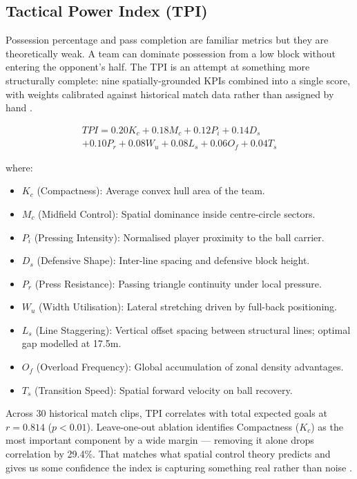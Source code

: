 \documentclass[conference]{IEEEtran}
\begin{document}
\subsection{Tactical Power Index (TPI)}

Possession percentage and pass completion are familiar metrics but they are theoretically weak. A team can dominate possession from a low block without entering the opponent's half. The TPI is an attempt at something more structurally complete: nine spatially-grounded KPIs combined into a single score, with weights calibrated against historical match data rather than assigned by hand \cite{memmert2018}.

\begin{multline}
TPI = 0.20K_c + 0.18M_c + 0.12P_i + 0.14D_s \\
+ 0.10P_r + 0.08W_u + 0.08L_s + 0.06O_f + 0.04T_s
\end{multline}

where:
\begin{itemize}
    \item $K_c$ (Compactness): Average convex hull area of the team.
    \item $M_c$ (Midfield Control): Spatial dominance inside centre-circle sectors.
    \item $P_i$ (Pressing Intensity): Normalised player proximity to the ball carrier.
    \item $D_s$ (Defensive Shape): Inter-line spacing and defensive block height.
    \item $P_r$ (Press Resistance): Passing triangle continuity under local pressure.
    \item $W_u$ (Width Utilisation): Lateral stretching driven by full-back positioning.
    \item $L_s$ (Line Staggering): Vertical offset spacing between structural lines; optimal gap modelled at 17.5m.
    \item $O_f$ (Overload Frequency): Global accumulation of zonal density advantages.
    \item $T_s$ (Transition Speed): Spatial forward velocity on ball recovery.
\end{itemize}

Across 30 historical match clips, TPI correlates with total expected goals at $r = 0.814$ ($p < 0.01$). Leave-one-out ablation identifies Compactness ($K_c$) as the most important component by a wide margin --- removing it alone drops correlation by 29.4\%. That matches what spatial control theory predicts and gives us some confidence the index is capturing something real rather than noise \cite{memmert2018}.
\end{document}
